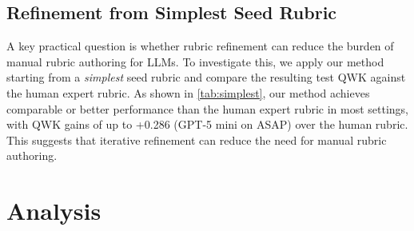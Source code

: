 \documentclass[11pt]{article}
\begin{document}
\subsection{Refinement from Simplest Seed Rubric}
\label{sec:simplest_seed}
\begin{table}[t]
\centering
\small
{}
\caption{QWK comparison: rubrics refined from the simplest seed (``Based on the response's content, rate the response on a scale of 1 to 6.'') vs.\ the rubric written by human experts. $\Delta$ denotes QWK improvement over the baseline using human expert rubrics. Our method achieves comparable or better performance than the human expert rubric in most settings, demonstrating that iterative refinement can reduce the need for manual rubric authoring.}
\label{tab:simplest}
\end{table}
A key practical question is whether rubric refinement can reduce the burden of manual rubric authoring for LLMs. To investigate this, we apply our method starting from a \textit{simplest} seed rubric and compare the resulting test QWK against the human expert rubric. As shown in \autoref{tab:simplest}, our method achieves comparable or better performance than the human expert rubric in most settings, with QWK gains of up to +0.286 (GPT-5 mini on ASAP) over the human rubric. This suggests that iterative refinement can reduce the need for manual rubric authoring.

\section{Analysis}
\label{sec:analysis}

\end{document}
